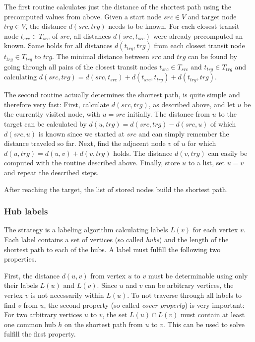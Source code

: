 			The first routine calculates just the distance of the shortest path using the precomputed values from above.
			Given a start node $src \in V$ and target node $trg \in V$, the distance $d(src, trg)$ needs to be known.
			For each closest transit node $t_{src} \in T_{src}$ of $src$, all distances $d(src, t_{src})$ were already precomputed an known.
			Same holds for all distances $d(t_{trg}, trg)$ from each closest transit node $t_{trg} \in T_{trg}$ to $trg$.
			The minimal distance between $src$ and $trg$ can be found by going through all pairs of the closest transit nodes $t_{src} \in T_{src}$ and $t_{trg} \in T_{trg}$ and calculating $d(src, trg) = d(src, t_{src}) + d(t_{src}, t_{trg}) + d(t_{trg}, trg)$.
			
			The second routine actually determines the shortest path, is quite simple and therefore very fast:
			First, calculate $d(src, trg)$, as described above, and let $u$ be the currently visited node, with $u = src$ initially.
			The distance from $u$ to the target can be calculated by $d(u, trg) = d(src, trg) - d(src, u)$ of which $d(src, u)$ is known since we started at $src$ and can simply remember the distance traveled so far.
			Next, find the adjacent node $v$ of $u$ for which $d(u, trg) = d(u, v) + d(v, trg)$ holds.
			The distance $d(v, trg)$ can easily be computed with the routine described above.
			Finally, store $u$ to a list, set $u = v$ and repeat the described steps.
			
			After reaching the target, the list of stored nodes build the shortest path.
		
		\subsubsection{Hub labels}
		
			The  strategy \cite{bast-transportation-networks} is a labeling algorithm calculating labels $L(v)$ for each vertex $v$.
			Each label contains a set of vertices (so called \emph{hubs}) and the length of the shortest path to each of the hubs.
			A label must fulfill the following two properties.
			
			First, the distance $d(u, v)$ from vertex $u$ to $v$ must be determinable using only their labels $L(u)$ and $L(v)$.
			Since $u$ and $v$ can be arbitrary vertices, the vertex $v$ is not necessarily within $L(u)$.
			To not traverse through all labels to find $v$ from $u$, the second property (so called \emph{cover property}) is very important:
			For two arbitrary vertices $u$ to $v$, the set $L(u) \cap L(v)$ must contain at least one common hub $h$ on the shortest path from $u$ to $v$.
			This can be used to solve fulfill the first property.
			
